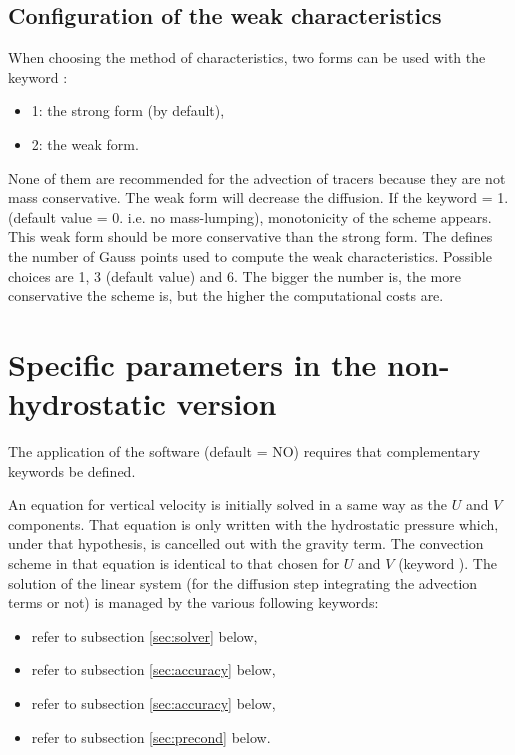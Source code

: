 \subsection{Configuration of the weak characteristics}

When choosing the method of characteristics, two forms can be used with the
keyword :

\begin{itemize}
\item 1: the strong form (by default),

\item 2: the weak form.
\end{itemize}

None of them are recommended for the advection of tracers because they are not
mass conservative. The weak form will decrease the diffusion. If the keyword
 = 1. (default value = 0. i.e. no
mass-lumping), monotonicity of the scheme appears. This weak form should be
more conservative than the strong form. The  defines the number of Gauss points used to compute the
weak characteristics. Possible choices are 1, 3 (default value) and 6. The
bigger the number is, the more conservative the scheme is, but the higher the
computational costs are.


\section{Specific parameters in the non-hydrostatic version}

The application of the software  (default = NO)
requires that complementary keywords be defined.

An equation for vertical velocity is initially solved in a same way as the
$U$ and $V$ components. That equation is only written with the
hydrostatic pressure which, under that hypothesis, is cancelled out with the
gravity term. The convection scheme in that equation is identical to that
chosen for $U$ and $V$ (keyword ). The solution of the linear system (for the diffusion step
integrating the advection terms or not) is managed by the various following
keywords:

\begin{itemize}
\item {} refer to subsection \ref{sec:solver} below,

\item {} refer to
subsection \ref{sec:accuracy} below,

\item {} refer to subsection \ref{sec:accuracy} below,

\item {} refer to subsection \ref{sec:precond}
below.
\end{itemize}

